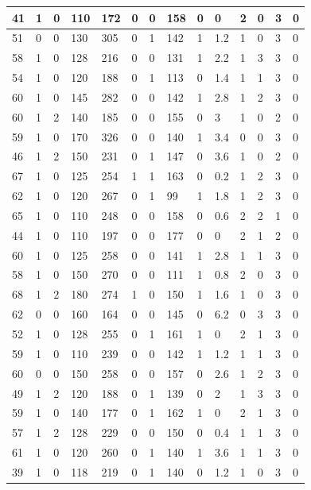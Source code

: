 \documentclass{article}
\begin{document}
\begin{table}[h!]
\begin{tabular}{|l|l|l|l|l|l|l|l|l|l|l|l|l|l|}
41 & 1 & 0 & 110 & 172 & 0 & 0 & 158 & 0 & 0 & 2  &0 & 3 & 0 \\ \hline
51 & 0 & 0 & 130 & 305 & 0 & 1 & 142 & 1 & 1.2 & 1  &0 & 3 & 0 \\ \hline
58 & 1 & 0 & 128 & 216 & 0 & 0 & 131 & 1 & 2.2 & 1  &3 & 3 & 0 \\ \hline
54 & 1 & 0 & 120 & 188 & 0 & 1 & 113 & 0 & 1.4 & 1  &1 & 3 & 0 \\ \hline
60 & 1 & 0 & 145 & 282 & 0 & 0 & 142 & 1 & 2.8 & 1  &2 & 3 & 0 \\ \hline
60 & 1 & 2 & 140 & 185 & 0 & 0 & 155 & 0 & 3 & 1  &0 & 2 & 0 \\ \hline
59 & 1 & 0 & 170 & 326 & 0 & 0 & 140 & 1 & 3.4 & 0  &0 & 3 & 0 \\ \hline
46 & 1 & 2 & 150 & 231 & 0 & 1 & 147 & 0 & 3.6 & 1  &0 & 2 & 0 \\ \hline
67 & 1 & 0 & 125 & 254 & 1 & 1 & 163 & 0 & 0.2 & 1  &2 & 3 & 0 \\ \hline
62 & 1 & 0 & 120 & 267 & 0 & 1 & 99 & 1 & 1.8 & 1  &2 & 3 & 0 \\ \hline
65 & 1 & 0 & 110 & 248 & 0 & 0 & 158 & 0 & 0.6 & 2  &2 & 1 & 0 \\ \hline
44 & 1 & 0 & 110 & 197 & 0 & 0 & 177 & 0 & 0 & 2  &1 & 2 & 0 \\ \hline
60 & 1 & 0 & 125 & 258 & 0 & 0 & 141 & 1 & 2.8 & 1  &1 & 3 & 0 \\ \hline
58 & 1 & 0 & 150 & 270 & 0 & 0 & 111 & 1 & 0.8 & 2  &0 & 3 & 0 \\ \hline
68 & 1 & 2 & 180 & 274 & 1 & 0 & 150 & 1 & 1.6 & 1  &0 & 3 & 0 \\ \hline
62 & 0 & 0 & 160 & 164 & 0 & 0 & 145 & 0 & 6.2 & 0  &3 & 3 & 0 \\ \hline
52 & 1 & 0 & 128 & 255 & 0 & 1 & 161 & 1 & 0 & 2  &1 & 3 & 0 \\ \hline
59 & 1 & 0 & 110 & 239 & 0 & 0 & 142 & 1 & 1.2 & 1  &1 & 3 & 0 \\ \hline
60 & 0 & 0 & 150 & 258 & 0 & 0 & 157 & 0 & 2.6 & 1  &2 & 3 & 0 \\ \hline
49 & 1 & 2 & 120 & 188 & 0 & 1 & 139 & 0 & 2 & 1  &3 & 3 & 0 \\ \hline
59 & 1 & 0 & 140 & 177 & 0 & 1 & 162 & 1 & 0 & 2  &1 & 3 & 0 \\ \hline
57 & 1 & 2 & 128 & 229 & 0 & 0 & 150 & 0 & 0.4 & 1  &1 & 3 & 0 \\ \hline
61 & 1 & 0 & 120 & 260 & 0 & 1 & 140 & 1 & 3.6 & 1  &1 & 3 & 0 \\ \hline
39 & 1 & 0 & 118 & 219 & 0 & 1 & 140 & 0 & 1.2 & 1  &0 & 3 & 0 \\ \hline

\end{tabular}
\end{table}
\end{document}

